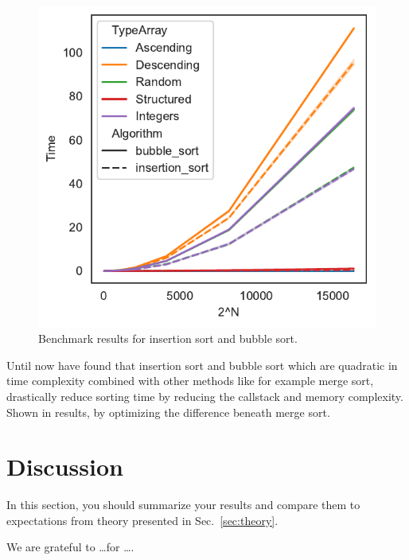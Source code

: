 \documentclass[sigconf, nonacm, natbib, screen, balance=False]{acmart}
\begin{document}
\begin{figure}
  \centering
  \includegraphics{foo}
  \caption{Benchmark results for insertion sort and bubble sort.}
  \label{fig:bench}
\end{figure}

Until now have found that insertion sort and bubble sort which are quadratic in time complexity combined with other methods like for example merge sort, drastically reduce sorting time by reducing the callstack and memory complexity. Shown in results, by optimizing the difference beneath merge sort.

\section{Discussion}\label{sec:discussion}

In this section, you should summarize your results and compare them to
expectations from theory presented in Sec.~\ref{sec:theory}.

\begin{acks}
We are grateful to \dots for \dots.
\end{acks}






\end{document}
